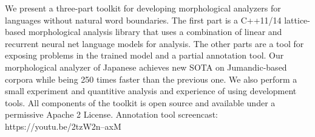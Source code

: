 We present a three-part toolkit for developing morphological analyzers for languages without natural word boundaries. The first part is a C++11/14 lattice-based morphological analysis library that uses a combination of linear and recurrent neural net language models for analysis. The other parts are a tool for exposing problems in the trained model and a partial annotation tool. Our morphological analyzer of Japanese achieves new SOTA on Jumandic-based corpora while being 250 times faster than the previous one. We also perform a small experiment and quantitive analysis and experience of using development tools. All components of the toolkit is open source and available under a permissive Apache 2 License. Annotation tool screencast: https://youtu.be/2tzW2n--axM
